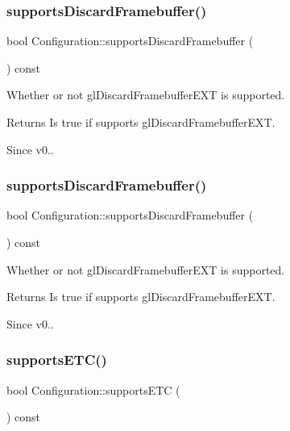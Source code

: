 \subsubsection{\texorpdfstring{supports\+Discard\+Framebuffer()}{supportsDiscardFramebuffer()}\hspace{0.1cm}{\footnotesize\ttfamily [1/2]}}
{\footnotesize\ttfamily bool Configuration\+::supports\+Discard\+Framebuffer (\begin{DoxyParamCaption}{ }\end{DoxyParamCaption}) const}

Whether or not gl\+Discard\+Framebuffer\+E\+XT is supported. \begin{DoxyReturn}{Returns}
Is true if supports gl\+Discard\+Framebuffer\+E\+XT. 
\end{DoxyReturn}
\begin{DoxySince}{Since}
v0.. 
\end{DoxySince}
\mbox{\label{classConfiguration_aefcc23eeb53ca5d1fa1115f370c46fe9}} 
\subsubsection{\texorpdfstring{supports\+Discard\+Framebuffer()}{supportsDiscardFramebuffer()}\hspace{0.1cm}{\footnotesize\ttfamily [2/2]}}
{\footnotesize\ttfamily bool Configuration\+::supports\+Discard\+Framebuffer (\begin{DoxyParamCaption}{ }\end{DoxyParamCaption}) const}

Whether or not gl\+Discard\+Framebuffer\+E\+XT is supported. \begin{DoxyReturn}{Returns}
Is true if supports gl\+Discard\+Framebuffer\+E\+XT. 
\end{DoxyReturn}
\begin{DoxySince}{Since}
v0.. 
\end{DoxySince}
\mbox{\label{classConfiguration_aeb2edb07e4e99adcc5cac8eb40dd5bd1}} 
\subsubsection{\texorpdfstring{supports\+E\+T\+C()}{supportsETC()}\hspace{0.1cm}{\footnotesize\ttfamily [1/2]}}
{\footnotesize\ttfamily bool Configuration\+::supports\+E\+TC (\begin{DoxyParamCaption}{ }\end{DoxyParamCaption}) const}

